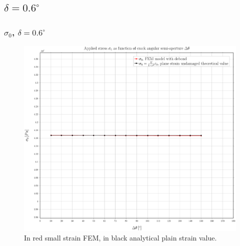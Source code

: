 \documentclass[first,firstsupp,lastsupp,handout,last,hyperref,table]{ETHclass}
\begin{document}

\subsection{$\delta=0.6^{\circ}$}

\begin{frame}
\frametitle{\small $\sigma_{0}$, $\delta=0.6^{\circ}$}
\vspace{-0.5cm}
\centering
\captionsetup[figure]{font=scriptsize,labelfont=scriptsize}
\begin{figure}[!h]
\centering
\includegraphics[height=0.7\textheight]{2017-07-10_AbqRunSummary_SmallStrainD06_sigma-inf_Summary.pdf}
  \caption{\scriptsize In red small strain FEM, in black analytical plain strain value.}
  \label{fig:res1}
\end{figure}
\end{frame}
\end{document}
